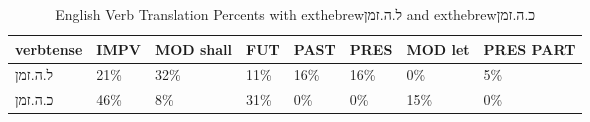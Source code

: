 \begin{table}[htbp!]
\centering
\caption{English Verb Translation Percents with 	exthebrew{ל.ה.זמן} and 	exthebrew{כ.ה.זמן}}
\label{table:clust2_tense_pr}
\begin{tabular}{llllllll}
\toprule
verbtense & IMPV & MOD shall &  FUT & PAST & PRES & MOD let & PRES PART \\
\midrule
\texthebrew{ל.ה.זמן} &  21\% &       32\% &  11\% &  16\% &  16\% &      0\% &        5\% \\
\texthebrew{כ.ה.זמן} &  46\% &        8\% &  31\% &   0\% &   0\% &     15\% &        0\% \\
\bottomrule
\end{tabular}
\end{table}
